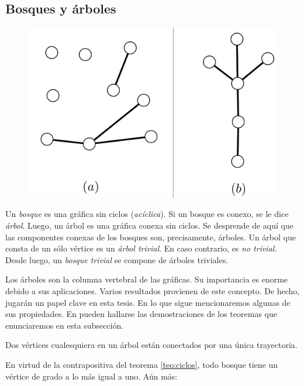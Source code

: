         \subsection{Bosques y árboles} \label{sec:arboles}
\begin{figure}
\vspace{-1cm}
 \centering
  \includegraphics[scale=0.25]{img/imgchapter1/arboles.jpg}
  \caption{}
  \label{fig:arboles}
\end{figure}
Un \textit{bosque} es una gráfica sin ciclos (\textit{acíclica}). Si un bosque es conexo, se le dice \textit{árbol}.  Luego, un árbol es una gráfica conexa sin ciclos. Se desprende de aquí que las componentes conexas de los bosques son, precisamente, árboles. Un  árbol que consta de un sólo vértice es un \textit{árbol trivial}. En caso contrario, es \textit{no trivial}. Desde luego, un \textit{bosque trivial} se compone de árboles triviales. 

Los árboles son la columna vertebral de las gráficas. Su importancia es enorme  debido a sus aplicaciones. Varios resultados provienen de este concepto. De hecho, jugarán un papel clave en esta tesis. En lo que sigue mencionaremos algunas de sus propiedades. En \cite{Diestel} pueden hallarse las demostraciones de los teoremas que enunciaremos en esta subsección.

\begin{prop}\label{prop:treepath}
Dos vértices cualesquiera en un árbol están conectados por una única trayectoria.
\end{prop}

En virtud de la contrapositiva del teorema \ref{teo:ciclos}, todo bosque tiene un vértice de grado a lo más igual a uno. Aún más:

